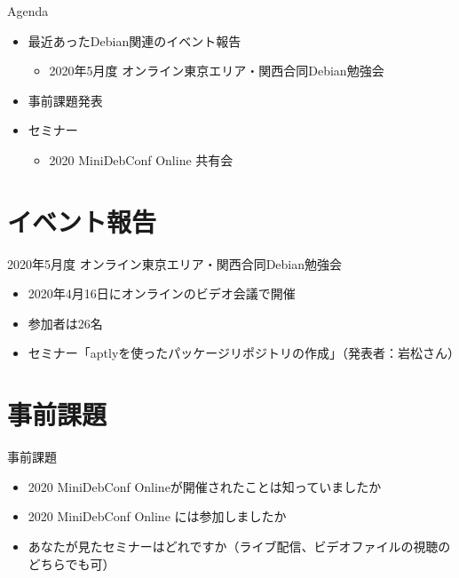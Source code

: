 \begin{frame}{Agenda}
 \begin{minipage}[t]{0.45\hsize}
  \begin{itemize}
  \item 最近あったDebian関連のイベント報告
    \begin{itemize}
    \item 2020年5月度 オンライン東京エリア・関西合同Debian勉強会
    \end{itemize}
  \item 事前課題発表
  \end{itemize}
 \end{minipage}
 \begin{minipage}[t]{0.45\hsize}
   \begin{itemize}
   \item セミナー
     \begin{itemize}
     \item 2020 MiniDebConf Online 共有会
     \end{itemize}
  \end{itemize}
 \end{minipage}
\end{frame}

\section{イベント報告}

\begin{frame}{2020年5月度 オンライン東京エリア・関西合同Debian勉強会}
\begin{itemize}
\item 2020年4月16日にオンラインのビデオ会議で開催
\item 参加者は26名
\item セミナー「aptlyを使ったパッケージリポジトリの作成」（発表者：岩松さん）
\end{itemize}
\end{frame}


\section{事前課題}


\begin{frame}{事前課題}
  \begin{itemize}
  \item 2020 MiniDebConf Onlineが開催されたことは知っていましたか
  \item 2020 MiniDebConf Online には参加しましたか
  \item あなたが見たセミナーはどれですか（ライブ配信、ビデオファイルの視聴のどちらでも可）
  \end{itemize}
\end{frame}

